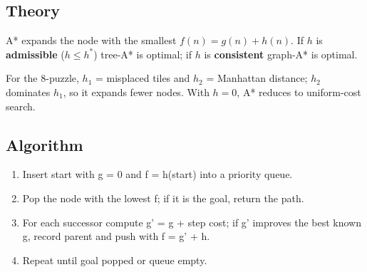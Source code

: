 \documentclass[11pt]{article}
\begin{document}
\subsection*{Theory}
A* expands the node with the smallest $f(n)=g(n)+h(n)$. If $h$ is \textbf{admissible} ($h\le h^*$) tree-A* is optimal; if $h$ is \textbf{consistent} graph-A* is optimal.

For the 8-puzzle, $h_1$ = misplaced tiles and $h_2$ = Manhattan distance; $h_2$ dominates $h_1$, so it expands fewer nodes. With $h=0$, A* reduces to uniform-cost search.
\subsection*{Algorithm}
\begin{algo}[Procedure]\begin{enumerate}
\item Insert start with g = 0 and f = h(start) into a priority queue.
\item Pop the node with the lowest f; if it is the goal, return the path.
\item For each successor compute g' = g + step cost; if g' improves the best known g, record parent and push with f = g' + h.
\item Repeat until goal popped or queue empty.
\end{enumerate}\end{algo}
\end{document}
